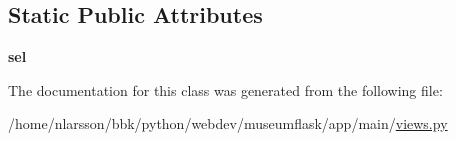 \subsection*{Static Public Attributes}
\begin{DoxyCompactItemize}
\item 
\mbox{\label{classviews_1_1AppConfiguration_ae7598955280379f2cbc76d5f2231214e}} 
{\bfseries sel}
\end{DoxyCompactItemize}


The documentation for this class was generated from the following file\+:\begin{DoxyCompactItemize}
\item 
/home/nlarsson/bbk/python/webdev/museumflask/app/main/\mbox{\hyperlink{views_8py}{views.\+py}}\end{DoxyCompactItemize}
